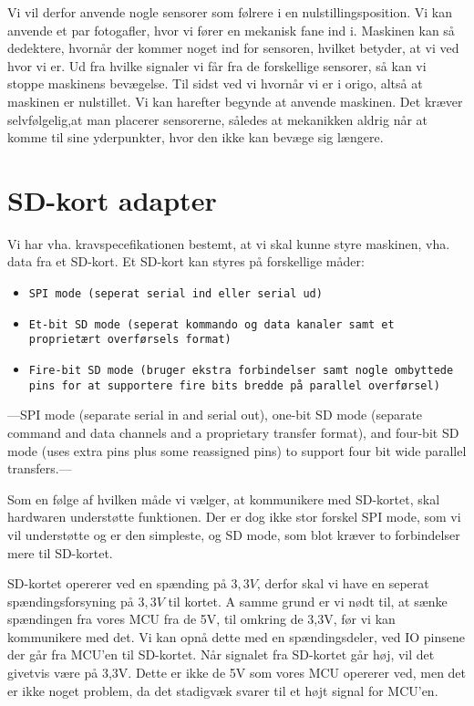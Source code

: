 Vi vil derfor anvende nogle sensorer som følrere i en
nulstillingsposition. Vi kan anvende et par fotogafler, hvor vi fører
en mekanisk fane ind i. Maskinen kan så dedektere, hvornår der kommer
noget ind for sensoren, hvilket betyder, at vi ved hvor vi er. Ud fra
hvilke signaler vi får fra de forskellige sensorer, så kan vi stoppe
maskinens bevægelse. Til sidst ved vi hvornår vi er i origo, altså at
maskinen er nulstillet. Vi kan harefter begynde at anvende
maskinen. Det kræver selvfølgelig,at man placerer sensorerne, således
at mekanikken aldrig når at komme til sine yderpunkter, hvor den ikke
kan bevæge sig længere.

\section{SD-kort adapter}
Vi har vha. kravspecefikationen bestemt, at vi skal kunne styre
maskinen, vha. data fra et SD-kort. Et SD-kort kan styres på
forskellige måder:

\begin{itemize}
\item{\texttt{SPI mode (seperat serial ind eller serial ud)}}
\item{\texttt{Et-bit SD mode (seperat kommando og data kanaler samt et
    proprietært overførsels format)}}
\item{\texttt{Fire-bit SD mode (bruger ekstra forbindelser samt nogle
    ombyttede pins for at supportere fire bits bredde på parallel
    overførsel)}}
\end{itemize}

---SPI mode (separate serial in and serial out), one-bit SD mode
(separate command and data channels and a proprietary transfer
format), and four-bit SD mode (uses extra pins plus some reassigned
pins) to support four bit wide parallel transfers.---



Som en følge af hvilken måde vi vælger, at kommunikere med SD-kortet,
skal hardwaren understøtte funktionen. Der er dog ikke stor forskel
SPI mode, som vi vil understøtte og er den simpleste, og SD mode, som
blot kræver to forbindelser mere til SD-kortet.

SD-kortet opererer ved en spænding på $3,3V$, derfor skal vi have en
seperat spændingsforsyning på $3,3V$ til kortet. A samme grund er vi
nødt til, at sænke spændingen fra vores MCU fra de 5V, til omkring de
3,3V, før vi kan kommunikere med det. Vi kan opnå dette med en
spændingsdeler, ved IO pinsene der går fra MCU'en til SD-kortet. Når
signalet fra SD-kortet går høj, vil det givetvis være på 3,3V. Dette
er ikke de 5V som vores MCU opererer ved, men det er ikke noget
problem, da det stadigvæk svarer til et højt signal for MCU'en.

